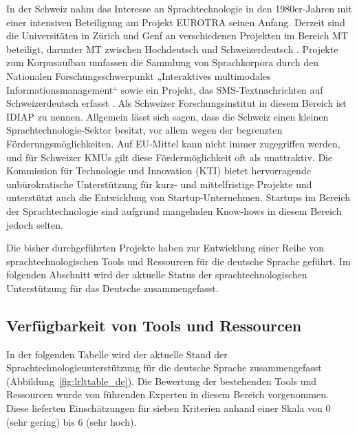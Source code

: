 \documentclass[]{../../metanetpaper}
\begin{document}
\begin{multicols}{2}
In der Schweiz nahm das Interesse an Sprachtechnologie in den 1980er-Jahren mit einer intensiven Beteiligung am Projekt EUROTRA seinen Anfang. Derzeit sind die Universitäten in Zürich und Genf an verschiedenen Projekten im Bereich MT beteiligt, darunter MT zwischen Hochdeutsch und Schweizerdeutsch \cite{latl1}. Projekte zum Korpusaufbau umfassen die Sammlung von Sprachkorpora durch den Nationalen Forschungsschwerpunkt „Interaktives multimodales Informationsmanagement“ sowie ein Projekt, das SMS-Text\-nach\-rich\-ten auf Schweizerdeutsch erfasst \cite{sor1}. Als Schweizer Forschungsinstitut in diesem Bereich ist IDIAP zu nennen. Allgemein lässt sich sagen, dass die Schweiz einen kleinen Sprach\-tech\-no\-lo\-gie-Sek\-tor besitzt, vor allem wegen der begrenzten Förderungsmöglichkeiten. Auf EU-Mittel kann nicht immer zugegriffen werden, und für Schweizer KMUs gilt diese Fördermöglichkeit oft als unattraktiv. Die Kommission für Technologie und Innovation (KTI) bietet hervorragende unbürokratische Unterstützung für kurz- und mittelfristige Projekte und unterstützt auch die Entwicklung von Start\-up-Un\-ter\-neh\-men. Startups im Bereich der Sprachtechnologie sind aufgrund mangelnden Know-hows in diesem Bereich jedoch selten.

Die bisher durchgeführten Projekte haben zur Entwicklung einer Reihe von sprachtechnologischen Tools und Ressourcen für die deutsche Sprache geführt. Im folgenden Abschnitt wird der aktuelle Status der sprachtechnologischen Unterstützung für das Deutsche zusammengefasst.

\subsection{Verfügbarkeit von Tools und Ressourcen}

In der folgenden Tabelle wird der aktuelle Stand der Sprachtechnologieunterstützung für die deutsche Sprache zusammengefasst (Abbildung~\ref{fig:lrlttable_de}). Die Bewertung der bestehenden Tools und Ressourcen wurde von führenden Experten in diesem Bereich vorgenommen. Diese lieferten Einschätzungen für sieben Kriterien anhand einer Skala von 0 (sehr gering) bis 6 (sehr hoch).


\end{multicols}
\end{document}
